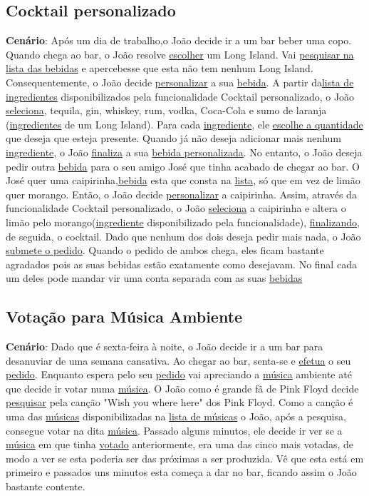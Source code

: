 \documentclass{article}
\begin{document}
\subsection*{Cocktail personalizado}
\textbf{Cenário}: Após um dia de trabalho,o João decide ir a um bar beber uma copo. Quando chega ao bar, o João resolve  \underline{escolher} um Long Island. Vai \underline{pesquisar na lista das bebidas} e apercebesse que esta não tem nenhum Long Island. Consequentemente, o João decide \underline{personalizar} a sua \underline{bebida}. A partir da\underline{lista de ingredientes} disponibilizados pela funcionalidade Cocktail personalizado, o João \underline{seleciona}, tequila, gin, whiskey, rum, vodka, Coca-Cola e sumo de laranja (\underline{ingredientes} de um Long Island). Para cada \underline{ingrediente}, ele \underline{escolhe a quantidade} que deseja que esteja presente. Quando já não deseja adicionar mais nenhum \underline{ingrediente}, o João \underline{finaliza} a sua \underline{bebida personalizada}. No entanto, o João deseja pedir outra \underline{bebida} para o seu amigo José que tinha acabado de chegar ao bar. O José quer uma caipirinha,\underline{bebida} esta que consta na \underline{lista}, só que em vez de limão quer morango. Então, o João decide \underline{personalizar} a caipirinha. Assim, através da funcionalidade Cocktail personalizado, o João \underline{seleciona} a caipirinha e altera o limão pelo morango(\underline{ingrediente} disponibilizado pela funcionalidade), \underline{finalizando}, de seguida, o cocktail. Dado que nenhum dos dois deseja pedir mais nada, o João \underline{submete o pedido}. Quando o pedido de ambos chega, eles ficam bastante agradados pois as suas bebidas estão exatamente como desejavam. No final cada um deles pode mandar vir uma conta separada com as suas \underline{bebidas}\\

\subsection*{Votação para Música Ambiente}
\textbf{Cenário}: Dado que é sexta-feira à noite, o João decide ir a um bar para desanuviar de uma semana cansativa. Ao chegar ao bar, senta-se e \underline{efetua} o seu \underline{pedido}. Enquanto espera pelo seu \underline{pedido} vai apreciando a  \underline{música} ambiente até que decide ir votar numa \underline{música}. O João como é grande fã de Pink Floyd decide \underline{pesquisar} pela canção "Wish you where here" dos Pink Floyd. Como a canção é uma das \underline{músicas} disponibilizadas na \underline{lista de músicas} o João, após a pesquisa, consegue votar na dita \underline{ música}. Passado alguns minutos, ele decide ir ver se a \underline{música} em que tinha \underline{votado} anteriormente, era uma das cinco mais votadas, de modo a ver se esta poderia ser das próximas a ser produzida. Vê que esta está em primeiro e passados uns minutos esta começa a dar no bar, ficando assim o João bastante contente.
\end{document}
